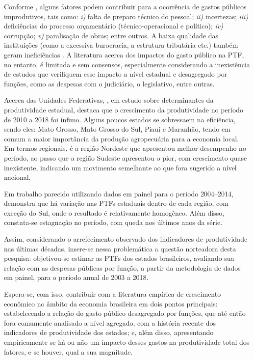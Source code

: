 \documentclass[
  12pt,
  a4paper,
  oneside,
  brazil,
  chapter=TITLE,
  section=TITLE
]{abntex2}
\begin{document}
Conforme , alguns fatores podem contribuir para a ocorrência de gastos públicos improdutivos, tais como: \textit{i)} falta de preparo técnico do pessoal; \textit{ii)} incertezas; \textit{iii)} deficiências do processo orçamentário (técnico-operacional e político); \textit{iv)} corrupção; \textit{v)} paralisação de obras; entre outros. A baixa qualidade das instituições (como a excessiva burocracia, a estrutura tributária etc.) também geram ineficiências \cite{mation2014}. A literatura acerca dos impactos do gasto público na PTF, no entanto, é limitada e sem consensos, especialmente considerando a inexistência de estudos que verifiquem esse impacto a nível estadual e desagregado por funções, como as despesas com o judiciário, o legislativo, entre outras.

Acerca das Unidades Federativas, , em estudo sobre determinantes da produtividade estadual, destaca que o crescimento da produtividade no período de 2010 a 2018 foi ínfimo. Alguns poucos estados se sobressaem na eficiência, sendo eles: Mato Grosso, Mato Grosso do Sul, Piauí e Maranhão, tendo em comum a maior importância da produção agropecuária para a economia local. Em termos regionais, é a região Nordeste que apresentou melhor desempenho no período, ao passo que a região Sudeste apresentou o pior, com crescimento quase inexistente, indicando um movimento semelhante ao que fora sugerido a nível nacional.

Em trabalho parecido utilizando dados em painel para o período 2004--2014,  demonstra que há variação nas PTFs estaduais dentro de cada região, com exceção do Sul, onde o resultado é relativamente homogêneo. Além disso, constata-se estagnação no período, com queda nos últimos anos da série.

Assim, considerando o arrefecimento observado dos indicadores de produtividade nas últimas décadas, insere-se nessa problemática a questão norteadora desta pesquisa: objetivou-se estimar as PTFs dos estados brasileiros, avaliando sua relação com as despesas públicas por função, a partir da metodologia de dados em painel, para o período anual de 2003 a 2018.

Espera-se, com isso, contribuir com a literatura empírica de crescimento econômico no âmbito da economia brasileira em dois pontos principais: estabelecendo a relação do gasto público desagregado por funções, que até então fora comumente analisado a nível agregado, com a história recente dos indicadores de produtividade dos estados; e, além disso, apresentando empiricamente se há ou não um impacto desses gastos na produtividade total dos fatores, e se houver, qual a sua magnitude.
\end{document}
